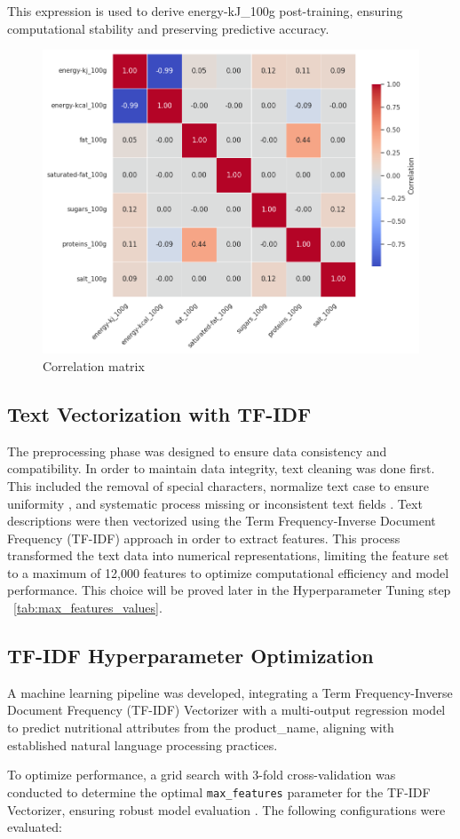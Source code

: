 This expression is used to derive energy-kJ\_100g post-training, ensuring computational stability and preserving predictive accuracy.

\begin{figure}[H]
\includegraphics[width=1.15\textwidth]{images/correlation_matrix.png}
\caption{Correlation matrix} 
\label{fig:Correlation_matrix}
\end{figure}

\subsection{Text Vectorization with TF-IDF}
The preprocessing phase was designed to ensure data consistency and compatibility. In order to maintain data integrity, text cleaning was done first. This included the removal of special characters, normalize text case to ensure uniformity , and systematic process missing or inconsistent text fields . Text descriptions were then vectorized using the Term Frequency-Inverse Document Frequency (TF-IDF) approach in order to extract features. This process transformed the text data into numerical representations, limiting the feature set to a maximum of 12,000 features  to optimize computational efficiency and model performance. This choice will be proved later in the Hyperparameter Tuning step ~\ref{tab:max_features_values}.

\subsection{TF-IDF Hyperparameter Optimization}
A machine learning pipeline was developed, integrating a Term Frequency-Inverse Document Frequency (TF-IDF) Vectorizer with a multi-output regression model to predict nutritional attributes from the product\_name, aligning with established natural language processing practices.
\par To optimize performance, a grid search with 3-fold cross-validation was conducted to determine the optimal \texttt{max\_features} parameter for the TF-IDF Vectorizer, ensuring robust model evaluation \cite{hastie2009elements}. The following configurations were evaluated:

